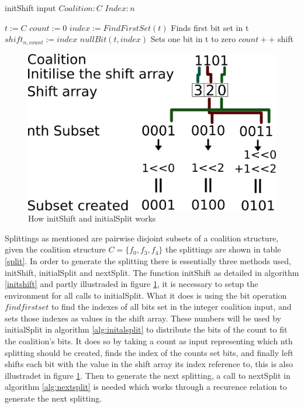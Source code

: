 \documentclass{llncs}
\begin{document}
\begin{algorithm}
\caption{initShift input $Coalition:C$ $Index:n$ \label{initshift}}
\begin{algorithmic}[1]
\STATE $t :=C$
\STATE $count := 0$
 { 
\STATE $index := FindFirstSet(t)$ \hfill Finds first bit set in t
\STATE $shift_{n,count} := index$ 
\STATE $nullBit(t,index)$ \hfill Sets one bit in t to zero
\STATE $count++$
}
\ENDWHILE
\RETURN shift
\end{algorithmic}
\end{algorithm}

\begin{figure}
\centering
\includegraphics[width=0.5\linewidth]{test}
\caption{How initShift and initialSplit works\label{fig:howitworks}}
\end{figure}


Splittings as mentioned are pairwise disjoint subsets of a coalition structure, 
given the coalition structure $C = \{f_0,f_3,f_4\}$ the splittings
are shown in table \ref{split}. In order to generate the splitting there is essentially three methods used, 
initShift, initialSplit and nextSplit. 
The function initShift as detailed in algorithm \ref{initshift} and partly illustraded in figure \ref{fig:howitworks}, 
it is necessary to setup the environment for all calls to initialSplit. 
What it does is using the bit operation $find first set$ to find the indexes of all bits set
in the integer coalition input, and sets those indexes as values in the shift array.
These numbers will be used by initialSplit in algorithm \ref{alg:initalsplit} to distribute the bits of the count to fit the coalition's bits.
It does so by taking a count as input representing which nth splitting should be created, finds the index of the counts 
set bits, and finally left shifts each bit with the value in the shift array its index reference to, 
this is also illustradet in figure \ref{fig:howitworks}.
Then to generate the next splitting, a call to nextSplit in algorithm \ref{alg:nextsplit} is needed which works through a recurence relation to generate the next splitting.
\end{document}
